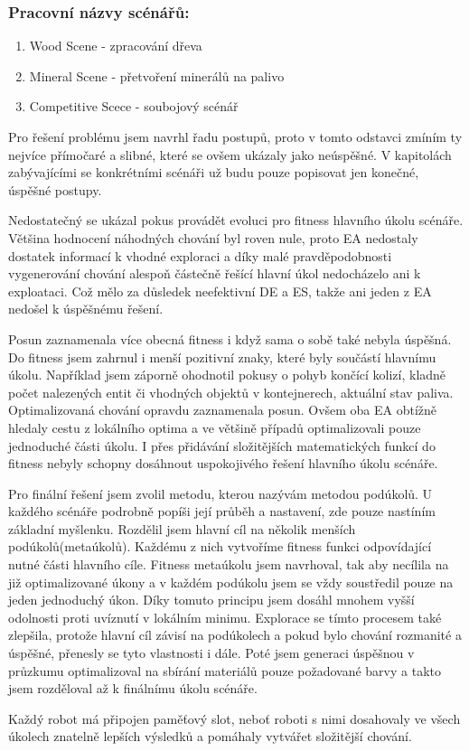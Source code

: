 \subsubsection{Pracovní názvy scénářů:}
\begin{enumerate}
	\item Wood Scene - zpracování dřeva
	\item Mineral Scene - přetvoření minerálů na palivo 
	\item Competitive Scece - soubojový scénář
\end{enumerate}
\par
Pro řešení problému jsem navrhl řadu postupů, proto v tomto odstavci zmíním ty nejvíce přímočaré a slibné, které se ovšem ukázaly  jako neúspěšné. V kapitolách zabývajícími se konkrétními scénáři už budu pouze popisovat jen konečné, úspěšné postupy.
 \par
Nedostatečný se ukázal pokus provádět evoluci pro fitness hlavního úkolu scénáře. Většina hodnocení náhodných chování byl roven nule, proto EA nedostaly dostatek informací k vhodné exploraci a díky malé pravděpodobnosti vygenerování chování alespoň částečně řešící hlavní úkol nedocházelo ani k exploataci. Což mělo za důsledek neefektivní  DE a ES, takže ani jeden z EA nedošel k úspěšnému řešení. 
\par
Posun zaznamenala více obecná fitness i když sama o sobě také nebyla úspěšná. Do fitness jsem zahrnul i menší pozitivní znaky, které byly součástí hlavnímu úkolu. Například jsem záporně ohodnotil pokusy o pohyb končící kolizí, kladně počet nalezených entit či vhodných objektů v kontejnerech, aktuální stav paliva. Optimalizovaná chování opravdu zaznamenala posun. Ovšem oba EA obtížně hledaly cestu z lokálního optima a ve většině případů optimalizovali pouze jednoduché části úkolu. I přes přidávání složitějších matematických funkcí do fitness nebyly schopny dosáhnout uspokojivého řešení hlavního úkolu scénáře. 
\par 
Pro finální řešení jsem zvolil metodu, kterou nazývám metodou podúkolů. U každého scénáře podrobně popíši její průběh a nastavení, zde pouze nastíním základní  myšlenku. Rozdělil jsem hlavní cíl na několik menších podúkolů(metaúkolů). Každému z nich vytvoříme fitness funkci odpovídající nutné části hlavního cíle. Fitness metaúkolu jsem navrhoval, tak aby necílila na již optimalizované úkony a v každém podúkolu jsem se vždy soustředil pouze na jeden jednoduchý úkon. Díky tomuto principu jsem dosáhl mnohem vyšší odolnosti proti uvíznutí v lokálním minimu. Explorace se tímto procesem také zlepšila, protože hlavní cíl závisí na podúkolech a pokud bylo chování rozmanité a úspěšné, přenesly se tyto vlastnosti i dále. Poté jsem generaci úspěšnou v průzkumu optimalizoval na sbírání materiálů pouze požadované barvy a takto jsem rozděloval až k finálnímu úkolu scénáře. 
\par 
Každý robot má připojen paměťový slot, neboť roboti s nimi dosahovaly ve všech úkolech znatelně lepších výsledků a pomáhaly vytvářet složitější chování. 

